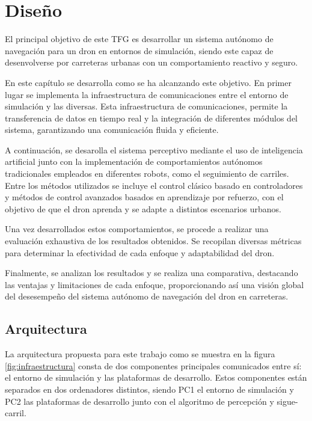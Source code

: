 \chapter{Diseño}
\label{cap:capitulo4}


\vspace{1cm}
El principal objetivo de este TFG es desarrollar un sistema autónomo de navegación para un dron en entornos de simulación, siendo este capaz de desenvolverse
por carreteras urbanas con un comportamiento reactivo y seguro. 

En este capítulo se desarrolla como se ha alcanzando este objetivo. En primer lugar se implementa la infraestructura de comunicaciones entre el entorno de simulación y las diversas. Esta 
infraestructura de comunicaciones, permite la transferencia de datos en tiempo real y la integración de diferentes módulos del sistema, garantizando 
una comunicación fluida y eficiente.

A continuación, se desarolla el sistema perceptivo mediante el uso de inteligencia artificial junto con la implementación de comportamientos autónomos tradicionales empleados
 en diferentes robots, como el seguimiento de carriles. Entre los métodos utilizados se incluye 
el control clásico basado en controladores y métodos de control avanzados basados en aprendizaje por refuerzo, con el objetivo de que el dron aprenda y se 
adapte a distintos escenarios urbanos. 

Una vez desarrollados estos comportamientos, se procede a realizar una evaluación exhaustiva de los resultados obtenidos. Se recopilan
diversas métricas para determinar la efectividad de cada enfoque y adaptabilidad del dron. 

Finalmente, se analizan los resultados y se realiza una comparativa, destacando las ventajas y limitaciones de cada enfoque, 
proporcionando así una visión global del desesempeño del sistema autónomo 
de navegación del dron en carreteras.\newline

\section{Arquitectura}
\label{sec:Arquitectura}

La arquitectura propuesta para este trabajo como se muestra en la figura \ref{fig:infraestructura} consta de dos componentes principales 
comunicados entre sí: el entorno de simulación  y las plataformas de desarrollo. Estos componentes 
están separados en dos ordenadores distintos, siendo PC1 el entorno de simulación y PC2 las plataformas de desarrollo junto con el algoritmo de percepción y sigue-carril. 

